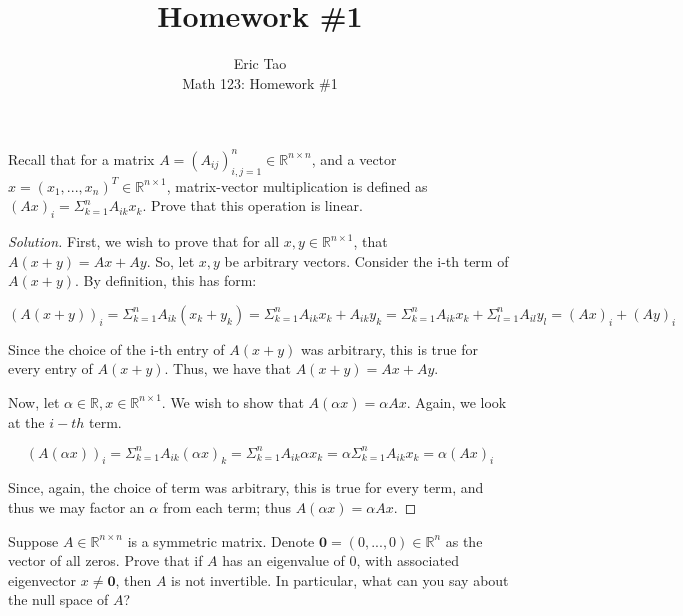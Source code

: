\documentclass[10pt]{article}
\newenvironment{problem}[2][]{\begin{trivlist}
\item[\hskip \labelsep {\bfseries #1}\hskip \labelsep {\bfseries #2.}]}{\end{trivlist}}
\begin{document}
 
\title{Homework \#1}
\author{Eric Tao\\
Math 123: Homework \#1}
\maketitle

\begin{problem}{Question 1}

Recall that for a matrix $A = (A_{ij})_{i,j=1}^n \in \mathbb{R}^{n\times n}$, and a vector $x = (x_1,...,x_n)^T \in \mathbb{R}^{n \times 1}$, matrix-vector multiplication is defined as $(Ax)_i = \Sigma_{k=1}^n A_{ik} x_k$. Prove that this operation is linear.

\end{problem}
\begin{proof}[Solution]

First, we wish to prove that for all $x,y \in \mathbb{R}^{n\times1}$, that $A(x+y) = Ax + Ay$. So, let $x,y$ be arbitrary vectors. Consider the i-th term of $A(x + y)$. By definition, this has form:

$$(A(x + y))_i = \Sigma_{k=1}^n A_{ik}(x_k+y_k) = \Sigma_{k=1}^n A_{ik}x_k + A_{ik}y_k = \Sigma_{k=1}^n A_{ik}x_k + \Sigma_{l=1}^n A_{il}y_l  = (Ax)_i + (Ay)_i $$

Since the choice of the i-th entry of $A(x+y)$ was arbitrary, this is true for every entry of $A(x+y)$. Thus, we have that $A(x+y) = Ax + Ay$.

Now, let $\alpha \in \mathbb{R}, x \in \mathbb{R}^{n\times1}$. We wish to show that $A(\alpha x) = \alpha Ax$. Again, we look at the $i-th$ term.

$$ (A(\alpha x))_i = \Sigma_{k=1}^n A_{ik} (\alpha x)_k =  \Sigma_{k=1}^n A_{ik} \alpha x_k = \alpha \Sigma_{k=1}^n A_{ik} x_k = \alpha(Ax)_i$$

Since, again, the choice of term was arbitrary, this is true for every term, and thus we may factor an $\alpha$ from each term; thus $A(\alpha x) = \alpha Ax$.

\end{proof}

\begin{problem}{Question 2}

Suppose $A \in \mathbb{R}^{n \times n}$ is a symmetric matrix. Denote $\mathbf{0} = (0,...,0) \in \mathbb{R}^n$ as the vector of all zeros. Prove that if $A$ has an eigenvalue of $0$, with associated eigenvector $x \not = \mathbf{0}$, then $A$ is not invertible. In particular, what can you say about the null space of $A$?

\end{problem}
\end{document}
